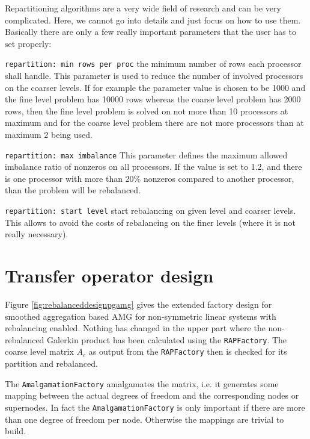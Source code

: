 \documentclass[10pt,fleqn]{book}
\begin{document}
Repartitioning algorithms are a very wide field of research and can be very complicated. Here, we cannot go into details and just focus on how to use them. Basically there are only a few really important parameters that the user has to set properly:
\begin{description}
\item \texttt{repartition: min rows per proc} the minimum number of rows each processor shall handle. This parameter is used to reduce the number of involved processors on the coarser levels. If for example the parameter value is chosen to be 1000 and the fine level problem has 10000 rows whereas the coarse level problem has 2000 rows, then the fine level problem is solved on not more than 10 processors at maximum and for the coarse level problem there are not more processors than at maximum 2 being used.
\item \texttt{repartition: max imbalance} This parameter defines the maximum allowed imbalance ratio of nonzeros on all processors. If the value is set to 1.2, and there is one processor with more than 20\% nonzeros compared to another processor, than the problem will be rebalanced.
\item \texttt{repartition: start level} start rebalancing on given level and coarser levels. This allows to avoid the costs of rebalancing on the finer levels (where it is not really necessary).
\end{description}

\section{Transfer operator design}

Figure \ref{fig:rebalanceddesignpgamg} gives the extended factory design for smoothed aggregation based AMG for non-symmetric linear systems with rebalancing enabled. Nothing has changed in the upper part where the non-rebalanced Galerkin product has been calculated using the \verb|RAPFactory|. The coarse level matrix $A_c$ as output from the \verb|RAPFactory| then is checked for its partition and rebalanced.

The \verb|AmalgamationFactory| amalgamates the matrix, i.e. it generates some mapping between the actual degrees of freedom and the corresponding nodes or supernodes. In fact the \verb|AmalgamationFactory| is only important if there are more than one degree of freedom per node. Otherwise the mappings are trivial to build.
\end{document}
